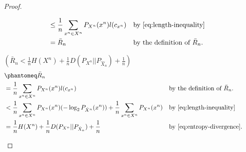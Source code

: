 \documentclass[
  coursecode={MTHE 474},
  assignmentname={Homework \homeworknumber},
  studentnumber=20053722,
  name={Bryan Hoang},
  swappartlabels,
  draft,
]{
  ltxanswer%
}
\begin{document}
\begin{questions}
\begin{parts}
\begin{subparts}
\begin{solution}
\begin{proof}
\begin{proofpart}
\begin{align*}
                 &\le \frac{1}{n} \sum_{x^{n}\in X^{n}} P_{X^{n}}(x^{n}) l(c_{x^{n}})                     & &\text{by~\eqref{eq:length-inequality}}       \\
                 &= \bar{R}_{n}                                                                           & &\text{by the definition of \(\bar{R}_{n}\).}
              \end{align*}
            \end{proofpart}
            \begin{proofpart}
              \(\left(\bar{R}_{n} < \frac{1}{n}H(X^{n}) + \frac{1}{n}D(P_{X^{n}}||P_{\hat{X}_{n}}) + \frac{1}{n} \right)\)
              \begin{align*}
                 &\phantomeq \bar{R}_{n}                                                                                                                                                                       \\
                 &= \frac{1}{n} \sum_{x^{n}\in X^{n}} P_{X^{n}}(x^{n}) l(c_{x^{n}})                                                                            & &\text{by the definition of \(\bar{R}_{n}\).} \\
                 &< \frac{1}{n} \sum_{x^{n}\in X^{n}} P_{X^{n}}(x^{n}) (-\log_{2} P_{\hat{X}^{n}}(x^{n})) + \frac{1}{n} \sum_{x^{n}\in X^{n}} P_{X^{n}}(x^{n}) & &\text{by~\eqref{eq:length-inequality}}       \\
                 &= \frac{1}{n}H(X^{n}) + \frac{1}{n}D(P_{X^{n}}||P_{\hat{X}_{n}}) + \frac{1}{n}                                                               & &\text{by~\eqref{eq:entropy-divergence}.}
              \end{align*}
            \end{proofpart}
          \end{proof}
        \end{solution}


\end{subparts}
\end{parts}
\end{questions}
\end{document}
